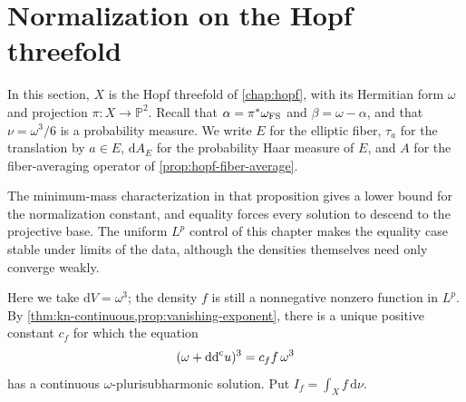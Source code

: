 \section{Normalization on the Hopf threefold}
\label{sec:hopf-lp-normalization}

In this section, $X$ is the Hopf threefold of \cref{chap:hopf}, with its Hermitian form $\omega$ and projection $\pi\colon X\to\mathbb P^2$. Recall that $\alpha=\pi^*\omega_{\mathrm{FS}}$ and $\beta=\omega-\alpha$, and that $\nu=\omega^3/6$ is a probability measure. We write $E$ for the elliptic fiber, $\tau_a$ for the translation by $a\in E$, $\mathrm{d}A_E$ for the probability Haar measure of $E$, and $A$ for the fiber-averaging operator of \cref{prop:hopf-fiber-average}.

The minimum-mass characterization in that proposition gives a lower bound for the normalization constant, and equality forces every solution to descend to the projective base. The uniform $L^p$ control of this chapter makes the equality case stable under limits of the data, although the densities themselves need only converge weakly.

Here we take $\mathrm{d}V=\omega^3$; the density $f$ is still a nonnegative nonzero function in $L^p$. By \cref{thm:kn-continuous,prop:vanishing-exponent}, there is a unique positive constant $c_f$ for which the equation
\[
 (\omega+\mathrm{dd}^{\mathrm{c}} u)^3=c_f f\,\omega^3
\]
has a continuous $\omega$-plurisubharmonic solution. Put $I_f=\int_Xf\,\mathrm{d}\nu$.

